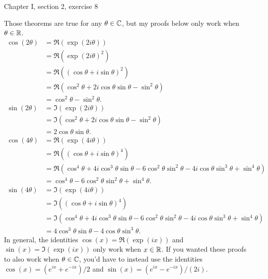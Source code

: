 \documentclass{article}
\begin{document}
\bigskip
\par
\begin{prob}
    Chapter I, section 2, exercise 8
\end{prob}
Those theorems are true for any $\theta \in \mathbb{C}$, but my proofs below only work when $\theta \in \mathbb{R}$.
\begin{align*}
    \cos (2 \theta) &= \Re(\exp(2i\theta)) \\
                    &= \Re(\exp(2i\theta)^2) \\
                    &= \Re \left( (\cos \theta + i \sin \theta)^2 \right) \\
                    &= \Re(\cos^2 \theta + 2i \cos \theta \sin \theta - \sin^2 \theta) \\
                    &= \cos^2 \theta - \sin^2 \theta. \\
    \sin(2 \theta) &= \Im(\exp(2i\theta)) \\
                    &= \Im(\cos^2 \theta + 2i \cos \theta \sin \theta - \sin^2 \theta) \\
                    &= 2 \cos \theta \sin \theta. \\
    \cos(4 \theta) &= \Re \left( \exp(4i\theta) \right) \\
                   &= \Re \left( (\cos \theta + i \sin \theta)^4 \right) \\
                   &= \Re \left( \cos^4 \theta + 4 i \cos^3 \theta \sin \theta - 6 \cos^2 \theta \sin^2 \theta - 4i \cos \theta \sin^3 \theta + \sin^4 \theta \right) \\
                   &= \cos^4 \theta - 6 \cos^2 \theta \sin^2 \theta + \sin^4 \theta. \\
    \sin(4 \theta) &= \Im \left( \exp(4i\theta) \right) \\
                   &= \Im \left( (\cos \theta + i \sin \theta)^4 \right) \\
                   &= \Im \left( \cos^4 \theta + 4 i \cos^3 \theta \sin \theta - 6 \cos^2 \theta \sin^2 \theta - 4i \cos \theta \sin^3 \theta + \sin^4 \theta \right) \\
                   &= 4 \cos^3 \theta \sin \theta - 4 \cos \theta \sin^3 \theta.
\end{align*}
In general, the identities $\cos(x) = \Re(\exp(ix))$ and $\sin(x) = \Im(\exp(ix))$ only work when $x \in \mathbb{R}$. If you wanted these proofs to also work when $\theta \in \mathbb{C}$, you'd have to instead use the identities $\cos(x) = (e^{ix}+e^{-ix})/2$ and $\sin(x) = (e^{ix}-e^{-ix})/(2i)$.
\end{document}
